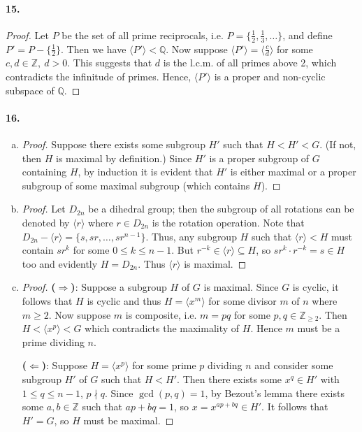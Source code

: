 \documentclass{article}
\begin{document}
\paragraph{15.}
\begin{proof}
  Let $P$ be the set of all prime reciprocals, i.e. $P = \{\frac{1}{2},
  \frac{1}{3}, \ldots\}$, and define $P' = P - \{\frac{1}{2}\}$. Then we have
  $\langle P' \rangle < \mathbb{Q}$. Now suppose $\langle P' \rangle =
  \langle\frac{c}{d}\rangle$ for some $c, d \in \mathbb{Z},\ d > 0$. This
  suggests that $d$ is the l.c.m. of all primes above 2, which contradicts the
  infinitude of primes. Hence, $\langle P' \rangle$ is a proper and non-cyclic
  subspace of $\mathbb{Q}$.
\end{proof}

\paragraph{16.} 
\begin{enumerate}[(a)]
  \item \begin{proof}
      Suppose there exists some subgroup $H'$ such that $H < H' < G$. (If not,
      then $H$ is maximal by definition.) Since $H'$ is a proper subgroup of $G$
      containing $H$, by induction it is evident that $H'$ is either maximal or
      a proper subgroup of some maximal subgroup (which contains $H$).
    \end{proof}
  \item \begin{proof}
      Let $D_{2n}$ be a dihedral group; then the subgroup of all rotations can
      be denoted by $\langle r \rangle$ where $r \in D_{2n}$ is the rotation
      operation. Note that $D_{2n} - \langle r \rangle = \{s, sr, \ldots,
      sr^{n-1}\}$. Thus, any subgroup $H$ such that $\langle r \rangle < H$
      must contain $sr^k$ for some $0 \leq k \leq n-1$. But $r^{-k} \in \langle
      r \rangle \subseteq H$, so $sr^k \cdot r^{-k} = s \in H$ too and
      evidently $H = D_{2n}$. Thus $\langle r \rangle$ is maximal.
    \end{proof}
  \item \begin{proof}
      \textbf{($\Rightarrow$)}: Suppose a subgroup $H$ of $G$ is maximal. Since
      $G$ is cyclic, it follows that $H$ is cyclic and thus $H = \langle x^m
      \rangle$ for some divisor $m$ of $n$ where $m \geq 2$. Now suppose $m$ is
      composite, i.e. $m = pq$ for some $p, q \in \mathbb{Z}_{\geq 2}$. Then $H
      < \langle x^p \rangle < G$ which contradicts the maximality of $H$. Hence
      $m$ must be a prime dividing $n$.

      \textbf{($\Leftarrow$)}: Suppose $H = \langle x^p \rangle$ for some prime
      $p$ dividing $n$ and consider some subgroup $H'$ of $G$ such that $H <
      H'$. Then there exists some $x^q \in H'$ with $1 \leq q \leq n - 1$, $p
      \nmid q$. Since $\gcd(p, q) = 1$, by Bezout's lemma there exists some $a,
      b \in \mathbb{Z}$ such that $ap + bq = 1$, so $x = x^{ap + bq} \in H'$.
      It follows that $H' = G$, so $H$ must be maximal.
    \end{proof}
\end{enumerate}
\end{document}
